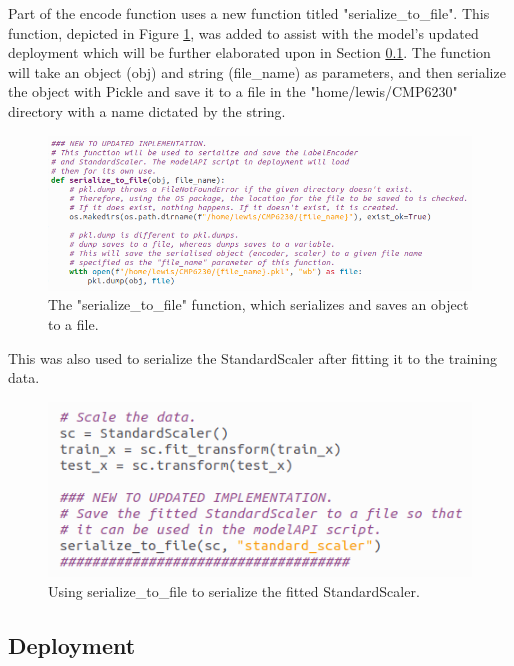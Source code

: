 \documentclass[12pt]{report}
\begin{document}
\noindent Part of the encode function uses a new function titled "serialize\_to\_file". This function, depicted in Figure \ref{fig:SerializeToFile},
was added to assist with the model's updated deployment which will be further elaborated upon in Section \ref{subsec:NewDeployment}. 
The function will take an object (obj) and string (file\_name) as parameters, and then serialize the object with Pickle and save it to a file
in the "home/lewis/CMP6230" directory with a name dictated by the string.

\begin{figure}[H]
    \centering
    \includegraphics[width=\linewidth]{Implementation/JAN 10 UPDATES/SerializeToFile.png}
    \caption{The "serialize\_to\_file" function, which serializes and saves an object to a file.}
    \label{fig:SerializeToFile}
\end{figure}

\noindent This was also used to serialize the StandardScaler after fitting it to the training data.

\begin{figure}[H]
    \centering
    \includegraphics[width=\linewidth]{Implementation/JAN 10 UPDATES/ScalerSerialize.png}
    \caption{Using serialize\_to\_file to serialize the fitted StandardScaler.}
    \label{fig:SerializeScaler}
\end{figure}

\subsection{Deployment}\label{subsec:NewDeployment}
\end{document}
